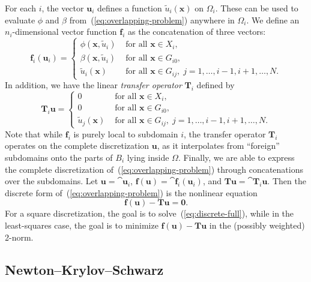 For each $i$, the vector $\bm{u}_i$ defines a function $\tilde{u}_i(\bm{x})$ on $\Omega_i$. These can be used to evaluate $\phi$ and $\beta$ from~(\ref{eq:overlapping-problem}) anywhere in $\Omega_i$. We define an $n_i$-dimensional vector function $\bm{f}_i$ as the concatenation of three vectors:
\begin{equation}
  \label{eq:fi}
  \bm{f}_i(\bm{u}_i) = 
  \begin{cases}
    \phi(\bm{x},\tilde{u}_i)& \text{ for all } \bm{x} \in X_i, \\
    \beta(\bm{x},\tilde{u}_i)& \text{ for all } \bm{x} \in G_{i0}, \\
    \tilde{u}_i(\bm{x}) & \text{ for all } \bm{x} \in G_{ij}, \; j=1,\ldots,i-1,i+1,\ldots,N.
  \end{cases}
\end{equation}
In addition, we have the linear \emph{transfer operator} $\bm{T}_i$ defined by
\begin{equation}
  \label{eq:Ti}
  \bm{T}_i\bm{u} = 
  \begin{cases}
    0 & \text{ for all } \bm{x} \in X_i, \\
    0 & \text{ for all } \bm{x} \in G_{i0}, \\
    \tilde{u}_j(\bm{x}) & \text{ for all } \bm{x} \in G_{ij}, \; j=1,\ldots,i-1,i+1,\ldots,N.
  \end{cases}
\end{equation}
Note that while $\bm{f}_i$ is purely local to subdomain $i$, the transfer operator $\bm{T}_i$ operates on the complete discretization $\bm{u}$, as it interpolates from ``foreign'' subdomains onto the parts of $B_i$ lying inside $\Omega$. 
Finally, we are able to express the complete discretization of~(\ref{eq:overlapping-problem}) through concatenations over the subdomains. Let $\bm{u}=\cat{\bm{u}_i}$, $\bm{f}(\bm{u})=\cat{\bm{f}_i(\bm{u}_i)}$, and $\bm{T}\bm{u} = \cat{\bm{T}_i\bm{u}}$. Then the discrete form of~(\ref{eq:overlapping-problem}) is the nonlinear equation
\begin{equation}
  \label{eq:discrete-full}
  \bm{f}(\bm{u}) - \bm{T} \bm{u} = \bm{0}.
\end{equation}
For a square discretization, the goal is to solve~(\ref{eq:discrete-full}), while in the least-squares case, the goal is to minimize $\bm{f}(\bm{u}) - \bm{T} \bm{u}$ in the (possibly weighted) 2-norm.

\subsection{Newton--Krylov--Schwarz}
\label{sec:NKS}

